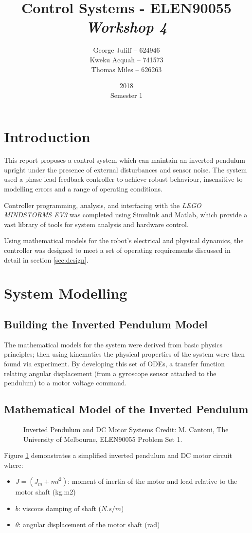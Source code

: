 \documentclass[11pt, a4paper,twocolumn]{article}
\title{\textbf{Control Systems - ELEN90055} \\ \textit{Workshop 4}}
\date{2018\\ Semester 1}
\author{George Juliff -- 624946\\ Kweku Acquah -- 741573\\Thomas Miles -- 626263}
\begin{document}
\maketitle
{}
\clearpage
{}
\section{Introduction}\label{sec:intro}
\quad This report proposes a control system which can maintain an inverted pendulum upright under the presence of external disturbances and sensor noise. The system used a phase-lead feedback controller to achieve robust behaviour, insensitive to modelling errors and a range of operating conditions.

Controller programming, analysis, and interfacing with the \textit{LEGO MINDSTORMS EV3} was completed using Simulink and Matlab, which provide a vast library of tools for system analysis and hardware control. 

Using mathematical models for the robot's electrical and physical dynamics, the controller was designed to meet a set of operating requirements discussed in detail in section \ref{sec:design}.
\section{	System Modelling	}\label{sec:model}
\subsection{	Building the Inverted Pendulum Model	}
\quad The mathematical models for the system were derived from basic physics principles; then using kinematics the physical properties of the system were then found via experiment.
By developing this set of ODEs, a transfer function relating angular displacement (from a gyroscope sensor attached to the  pendulum) to a motor voltage command.

\subsection{	Mathematical Model of the Inverted Pendulum		}


\begin{figure}[h!]
\centering
\caption{Inverted Pendulum and DC Motor Systems  \tiny Credit: M. Cantoni, The University of Melbourne, ELEN90055 Problem Set 1.}
\label{fig:diagram}
\end{figure}
Figure \ref{fig:diagram} demonstrates a simplified inverted pendulum and DC motor circuit where: 
\begin{itemize}
	\item $J = (J_m + ml^2)$: moment of inertia of the motor and load relative to the motor shaft (kg.m2)
	\item $b$: viscous damping of shaft ($N.s/m$)
	\item $\theta$: angular displacement of the motor shaft (rad)
\end{itemize}
\end{document}
